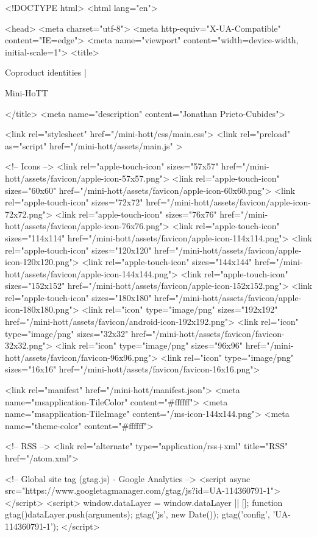 <!DOCTYPE html>
<html lang="en">

<head>
  <meta charset="utf-8">
  <meta http-equiv="X-UA-Compatible" content="IE=edge">
  <meta name="viewport" content="width=device-width, initial-scale=1">
  <title>
    
      
        Coproduct identities |
      
        Mini-HoTT
    
  </title>
  <meta name="description" content="Jonathan Prieto-Cubides">

  <link rel="stylesheet" href="/mini-hott/css/main.css">
  <link rel="preload" as="script" href="/mini-hott/assets/main.js" >

  <!-- Icons -->
  <link rel="apple-touch-icon" sizes="57x57" href="/mini-hott/assets/favicon/apple-icon-57x57.png">
  <link rel="apple-touch-icon" sizes="60x60" href="/mini-hott/assets/favicon/apple-icon-60x60.png">
  <link rel="apple-touch-icon" sizes="72x72" href="/mini-hott/assets/favicon/apple-icon-72x72.png">
  <link rel="apple-touch-icon" sizes="76x76" href="/mini-hott/assets/favicon/apple-icon-76x76.png">
  <link rel="apple-touch-icon" sizes="114x114" href="/mini-hott/assets/favicon/apple-icon-114x114.png">
  <link rel="apple-touch-icon" sizes="120x120" href="/mini-hott/assets/favicon/apple-icon-120x120.png">
  <link rel="apple-touch-icon" sizes="144x144" href="/mini-hott/assets/favicon/apple-icon-144x144.png">
  <link rel="apple-touch-icon" sizes="152x152" href="/mini-hott/assets/favicon/apple-icon-152x152.png">
  <link rel="apple-touch-icon" sizes="180x180" href="/mini-hott/assets/favicon/apple-icon-180x180.png">
  <link rel="icon" type="image/png" sizes="192x192"  href="/mini-hott/assets/favicon/android-icon-192x192.png">
  <link rel="icon" type="image/png" sizes="32x32" href="/mini-hott/assets/favicon/favicon-32x32.png">
  <link rel="icon" type="image/png" sizes="96x96" href="/mini-hott/assets/favicon/favicon-96x96.png">
  <link rel="icon" type="image/png" sizes="16x16" href="/mini-hott/assets/favicon/favicon-16x16.png">

  <link rel="manifest" href="/mini-hott/manifest.json">
  <meta name="msapplication-TileColor" content="#ffffff">
  <meta name="msapplication-TileImage" content="/ms-icon-144x144.png">
  <meta name="theme-color" content="#ffffff">

  <!-- RSS -->
  <link rel="alternate" type="application/rss+xml" title="RSS" href="/atom.xml">

  <!-- Global site tag (gtag.js) - Google Analytics -->
  <script async src="https://www.googletagmanager.com/gtag/js?id=UA-114360791-1"></script>
  <script>
    window.dataLayer = window.dataLayer || [];
    function gtag(){dataLayer.push(arguments);}
    gtag('js', new Date());
    gtag('config', 'UA-114360791-1');
  </script>

